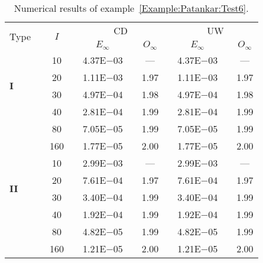 {\renewcommand{\baselinestretch}{1.0}
\begin{table}[H]
\caption{Numerical results of example~\ref{Example:Patankar:Test6}.}

\setlength{\tabcolsep}{5pt}
\centering
\begin{tabular}{@{}l c c c c c c c c c c@{}}
\toprule
\multirow{2}{*}{Type} &  & \multirow{2}{*}{$I$} &  & \multicolumn{3}{c}{CD} &  & \multicolumn{3}{c}{UW} \\
\cline{5-7}
\cline{9-11}
 & & & & $E_{\infty}$ & & $O_{\infty}$ & & $E_{\infty}$ & & $O_{\infty}$\\
\midrule
\multirow{4}{*}{\textbf{I}} 
 & & 10 & & 4.37E$-$03 & & --- & & 4.37E$-$03 & & ---\\
 & & 20 & & 1.11E$-$03 & & 1.97 & & 1.11E$-$03 & & 1.97\\
 & & 30 & & 4.97E$-$04 & & 1.98 & & 4.97E$-$04 & & 1.98\\
 & & 40 & & 2.81E$-$04 & & 1.99 & & 2.81E$-$04 & & 1.99\\
 & & 80 & & 7.05E$-$05 & & 1.99 & & 7.05E$-$05 & & 1.99\\
 & & 160 & & 1.77E$-$05 & & 2.00 & & 1.77E$-$05 & & 2.00\\
\midrule
\multirow{4}{*}{\textbf{II}} 
 & & 10 & & 2.99E$-$03 & & --- & & 2.99E$-$03 & & ---\\
 & & 20 & & 7.61E$-$04 & & 1.97 & & 7.61E$-$04 & & 1.97\\
 & & 30 & & 3.40E$-$04 & & 1.99 & & 3.40E$-$04 & & 1.99\\
 & & 40 & & 1.92E$-$04 & & 1.99 & & 1.92E$-$04 & & 1.99\\
 & & 80 & & 4.82E$-$05 & & 1.99 & & 4.82E$-$05 & & 1.99\\
 & & 160 & & 1.21E$-$05 & & 2.00 & & 1.21E$-$05 & & 2.00\\
\bottomrule
\end{tabular}
\label{Table:Patankar:Test6}
\end{table}}
